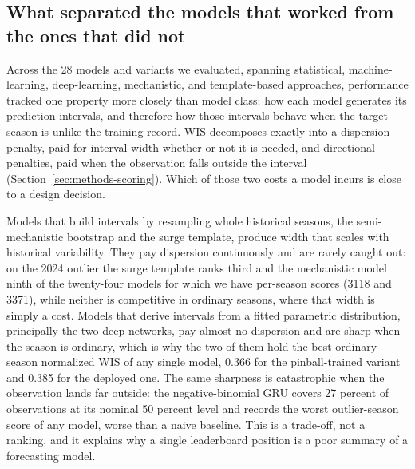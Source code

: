\documentclass[11pt]{article}
\begin{document}
\subsection{What separated the models that worked from the ones that did not}\label{sec:why}
Across the 28 models and variants we evaluated, spanning statistical, machine-learning, deep-learning, mechanistic, and
template-based approaches, performance tracked one property more closely than model class: how each
model generates its prediction intervals, and therefore how those intervals behave when the target
season is unlike the training record. WIS decomposes exactly into a dispersion penalty, paid for
interval width whether or not it is needed, and directional penalties, paid when the observation
falls outside the interval (Section~\ref{sec:methods-scoring}). Which of those two costs a model
incurs is close to a design decision.

Models that build intervals by resampling whole historical seasons, the semi-mechanistic bootstrap
and the surge template, produce width that scales with historical variability. They pay dispersion
continuously and are rarely caught out: on the 2024 outlier the surge template ranks third and the
mechanistic model ninth of the twenty-four models for which we have per-season scores (3118 and 3371),
while neither is competitive in ordinary seasons, where that width is simply a cost. Models that
derive intervals from a fitted parametric distribution, principally the two deep networks, pay
almost no dispersion and are sharp when the season is ordinary, which is why the two of them hold
the best ordinary-season normalized WIS of any single model, 0.366 for the pinball-trained variant
and 0.385 for the deployed one. The same sharpness is catastrophic when the
observation lands far outside: the negative-binomial GRU covers 27 percent of observations at its
nominal 50 percent level and records the worst outlier-season score of any model, worse than a naive
baseline. This is a trade-off, not a ranking, and it explains why a single leaderboard position is a
poor summary of a forecasting model.
\end{document}

